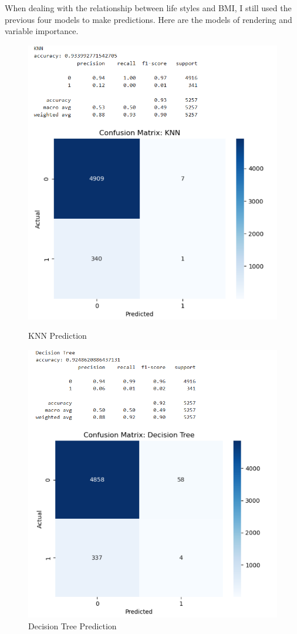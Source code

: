 \documentclass{article}
\begin{document}
When dealing with the relationship between life styles and BMI, I still used the previous four models to make predictions. Here are the models of rendering and variable importance.

\newpage
\begin{figure}[h!]
	\begin{minipage}{0.48\textwidth}
		\centering
		\includegraphics[width=0.7\linewidth]{../Image/P47.jpg}
		\caption{KNN Prediction}
		\label{fig:P47}
	\end{minipage}\hfill
	\begin{minipage}{0.48\textwidth}
		\centering
		\includegraphics[width=0.7\linewidth]{../Image/P48.jpg}
		\caption{Decision Tree Prediction}
		\label{fig:P48}
	\end{minipage}
	

\end{figure}
\end{document}
